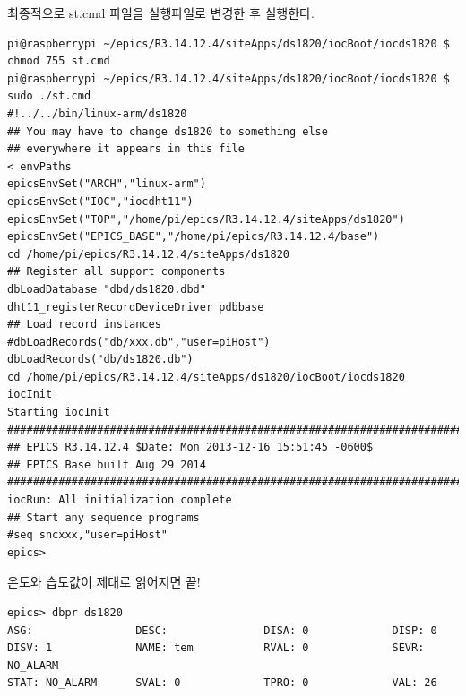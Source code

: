 \documentclass[11pt
  , a4paper
  , article
  , oneside
]{memoir}
\begin{document}
최종적으로 st.cmd 파일을 실행파일로 변경한 후 실행한다.
\begin{lstlisting}[style=termstyle]
pi@raspberrypi ~/epics/R3.14.12.4/siteApps/ds1820/iocBoot/iocds1820 $ chmod 755 st.cmd
pi@raspberrypi ~/epics/R3.14.12.4/siteApps/ds1820/iocBoot/iocds1820 $ sudo ./st.cmd
#!../../bin/linux-arm/ds1820
## You may have to change ds1820 to something else
## everywhere it appears in this file
< envPaths
epicsEnvSet("ARCH","linux-arm")
epicsEnvSet("IOC","iocdht11")
epicsEnvSet("TOP","/home/pi/epics/R3.14.12.4/siteApps/ds1820")
epicsEnvSet("EPICS_BASE","/home/pi/epics/R3.14.12.4/base")
cd /home/pi/epics/R3.14.12.4/siteApps/ds1820
## Register all support components
dbLoadDatabase "dbd/ds1820.dbd"
dht11_registerRecordDeviceDriver pdbbase
## Load record instances
#dbLoadRecords("db/xxx.db","user=piHost")
dbLoadRecords("db/ds1820.db")
cd /home/pi/epics/R3.14.12.4/siteApps/ds1820/iocBoot/iocds1820
iocInit
Starting iocInit
############################################################################
## EPICS R3.14.12.4 $Date: Mon 2013-12-16 15:51:45 -0600$
## EPICS Base built Aug 29 2014
############################################################################
iocRun: All initialization complete
## Start any sequence programs
#seq sncxxx,"user=piHost"
epics>
\end{lstlisting}
온도와 습도값이 제대로 읽어지면 끝!
\begin{lstlisting}[style=termstyle]
epics> dbpr ds1820
ASG:                DESC:               DISA: 0             DISP: 0
DISV: 1             NAME: tem           RVAL: 0             SEVR: NO_ALARM
STAT: NO_ALARM      SVAL: 0             TPRO: 0             VAL: 26
\end{lstlisting}





\end{document}

